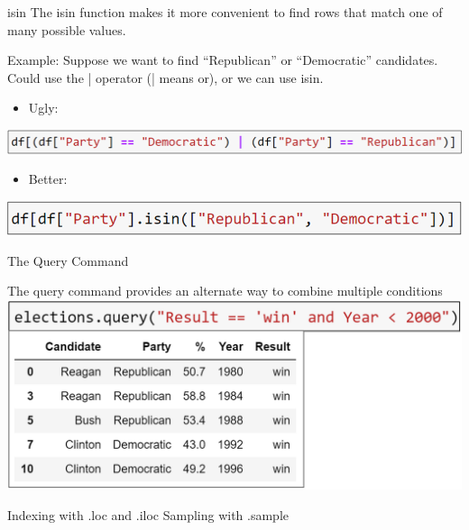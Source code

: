 \documentclass[aspectratio=169]{../latex_main/tntbeamer}  %
\begin{document}
	
	\begin{frame}{isin}
	    The isin function makes it more convenient to find rows that match one of many possible values.\\
	    \bigskip

	  Example: Suppose we want to find “Republican” or “Democratic” candidates. Could use the | operator (| means or), or we can use isin.
	  \begin{itemize}
	      \item Ugly:
	  \end{itemize}
	    \includegraphics[scale=.5]{Bild21}
	    \begin{itemize}
	        \item Better:
	    \end{itemize}
	    \includegraphics[scale=.5]{Bild22}
	\end{frame}
	
	\begin{frame}{The Query Command}

	  The query command provides an alternate way to combine multiple conditions
	  \includegraphics[scale=.5]{Bild23}
	\end{frame}
	
	\begin{frame}{Indexing with .loc and .iloc
Sampling with .sample}

	\end{frame}
	
\end{document}
